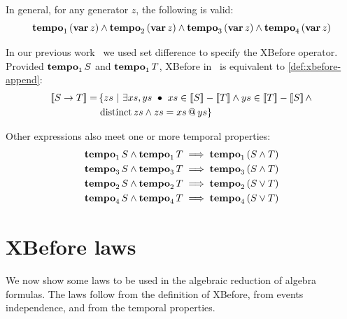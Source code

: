 \documentclass[12pt,openright,twoside,a4paper,oldfontcommands,english,brazil,final]{abntex2}
\makeatletter
\theoremstyle{theo}
\def\varop{\ensuremath\operatorname{\mathbf{var}}}
\newcommand{\var}[1]{\ensuremath\varop #1}
\def\xbeforeop{\ensuremath\rightarrow}
\newcommand{\xbefore}[2]{\ensuremath #1 \xbeforeop #2 }
\def\tempoop{\ensuremath\operatorname{\mathbf{tempo}}}
\newcommand{\tempo}[2][1-4]{\ensuremath\tempoop_{#1} #2}
\def\distinctop{\ensuremath\operatorname{distinct}}
\newcommand{\distinct}[1]{\ensuremath\distinctop #1}
\newcommand{\append}[2]{\ensuremath #1 \operatorname{\mathbf{@}} #2}
\newcommand{\parsin}[1]{\ensuremath\left( #1 \right)}
\newcommand{\denote}[1]{\ensuremath\left[\!\left[#1\right]\!\right]}
\makeatother
\begin{document}
In general, for any generator $z$, the following is valid:
%
\begin{equation}
\label{law:var-tempo}
\tempo[1]{\left(\var{z}\right)} \land
\tempo[2]{\left(\var{z}\right)} \land
\tempo[3]{\left(\var{z}\right)} \land
\tempo[4]{\left(\var{z}\right)}
\end{equation}

\begin{sloppypar}
In our previous work~\cite{DM2015} we used set difference to specify the \ac{XBefore} operator.
Provided $\tempo[1]{S}$ and $\tempo[1]{T}$, \ac{XBefore} in~\cite{DM2015} is equivalent to \cref{def:xbefore-append}:
%
\begin{align}
\denote{\xbefore{S}{T}} = &\left\{ zs ~\middle|~ \exists xs, ys ~\bullet~ xs \in \denote{S}-\denote{T} \land ys \in \denote{T}-\denote{S} \land \right.\nonumber\\
& \left. \distinct{zs} \land zs = \append{xs}{ys} \right\}\label{law:old-xbefore}
\end{align}
\end{sloppypar}

Other expressions also meet one or more temporal properties:
\begin{subequations}
\begin{align}
\tempo[1]{S} \land \tempo[1]{T} & \implies \tempo[1]{\parsin{S \land T}}\label{law:tempo1-inter}\\
\tempo[3]{S} \land \tempo[3]{T} & \implies \tempo[3]{\parsin{S \land T}}\label{law:tempo3-inter}\\
\tempo[2]{S} \land \tempo[2]{T} & \implies \tempo[2]{\parsin{S \lor T}}\label{law:tempo2-union}\\
\tempo[4]{S} \land \tempo[4]{T} & \implies \tempo[4]{\parsin{S \lor T}}\label{law:tempo4-union}
\end{align}
\end{subequations}

\section{\acs*{XBefore} laws}
\label{sec:xbefore-laws}

We now show some laws to be used in the algebraic reduction of \ac{algebra} formulas.
The laws follow from the definition of \ac{XBefore}, from events independence, and from the temporal properties.
\end{document}
